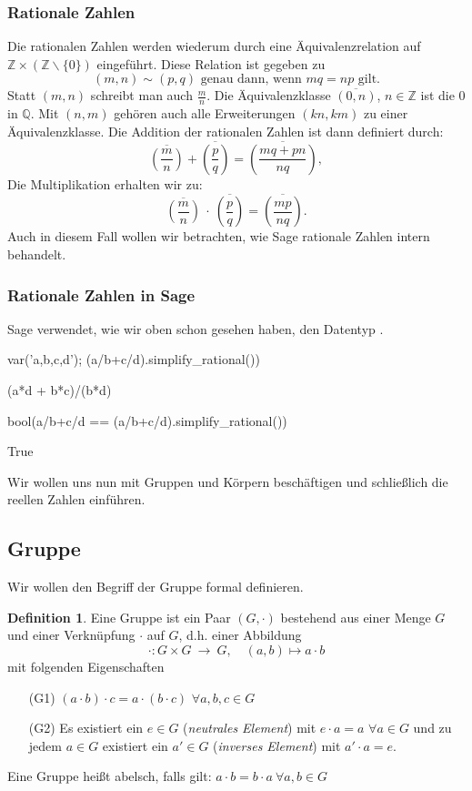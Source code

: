 \documentclass[fontsize=12pt,paper=a4,twoside,bibtotoc,idxtotoc,
liststotoc,pagesize,BCOR1.2cm,DIV15,chapterprefix,pagesize=pdftex]{scrbook}
\theoremstyle{plain}
\theoremstyle{definition}
\newtheorem{df}[equation]{Definition}
\theoremstyle{remark}
\begin{document}
\subsubsection{Rationale Zahlen}
Die rationalen Zahlen werden wiederum durch eine Äquivalenzrelation auf $\mathbb{Z}\times(\mathbb{Z}\smallsetminus \{ 0\})$ eingeführt. Diese 
Relation ist gegeben zu
\[ (m,n) \sim (p,q) \mbox{ genau dann, wenn } mq=np \mbox{ gilt.} \]
Statt $(m,n)$ schreibt man auch $\frac{m}{n}$.
Die Äquivalenzklasse $\overline{(0,n)}$, $n \in \mathbb{Z}$ ist
die $0$ in $\mathbb{Q}$.
 Mit $(n,m)$ gehören auch alle Erweiterungen $(kn,km)$ zu einer
Äquivalenzklasse. Die Addition der rationalen Zahlen ist dann definiert durch:  
\[ 
\overline{\genfrac(){}{}{m}{n}}+\overline{\genfrac(){}{}{p}{q}}=\overline{\genfrac(){}{}{mq+pn}{nq}},
\]
Die Multiplikation erhalten wir zu:
\[
\overline{\genfrac(){}{}{m}{n}} \ \cdot \ \overline{\genfrac(){}{}{p}{q}}=\overline{\genfrac(){}{}{mp}{nq}}.
\]
Auch in diesem Fall wollen wir betrachten, wie Sage rationale Zahlen intern behandelt.
\subsubsection{Rationale Zahlen in Sage}
Sage verwendet, wie wir oben schon gesehen haben, den Datentyp . 
\begin{sagein}
var('a,b,c,d'); (a/b+c/d).simplify_rational())
\end{sagein}
\begin{sage}
(a*d + b*c)/(b*d)
\end{sage}

\begin{sagein}
bool(a/b+c/d == (a/b+c/d).simplify_rational())
\end{sagein}
\begin{sage}
True
\end{sage}
Wir wollen uns nun mit Gruppen und Körpern beschäftigen und schließlich die reellen Zahlen einführen.
\subsection{Gruppe}
Wir wollen den Begriff der Gruppe formal definieren.
\begin{df}
 Eine Gruppe ist ein Paar $(G,\cdot)$ bestehend aus einer Menge $G$ und einer Verknüpfung $\cdot$ auf $G$, d.h. einer Abbildung
\[
 \cdot: G \times G \ \rightarrow \ G, \quad (a,b) \mapsto a \cdot b
\]
mit folgenden Eigenschaften
\begin{itemize}
 \item[(G1)] $(a \cdot b) \cdot c =a \cdot (b \cdot c)$ $\forall a,b,c\in G$
 \item[(G2)] Es existiert ein $e \in G$ ({\it neutrales Element}) mit $e \cdot a =a$ $\forall a
\in G$ und zu jedem $a \in G$ existiert ein $a' \in G$ ({\it inverses
Element}) mit $a' \cdot a=e$. 
\end{itemize}
Eine Gruppe heißt abelsch, falls gilt: $a\cdot b=b\cdot a\ \forall a,b\in G$
\end{df}
\end{document}
